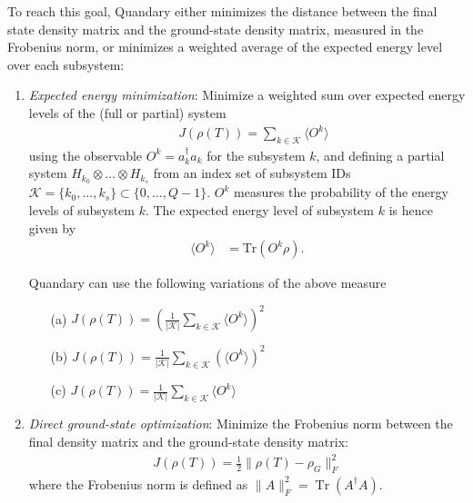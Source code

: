 \documentclass[11pt]{article}
\DeclareMathOperator{\Tr}{Tr}
\begin{document}
To reach this goal, Quandary either minimizes the distance between the final state
density matrix and the ground-state density matrix, measured in the Frobenius
norm, or minimizes a weighted average of the expected energy level over each subsystem:
\begin{enumerate}
  \item \textit{Expected energy minimization}: Minimize a weighted sum over
    expected energy levels of the (full or partial) system
    \begin{align}
       \quad J(\rho(T)) = \sum_{k\in \mathcal{K}} \langle O^k \rangle 
    \end{align}
    using the observable $O^k = a_k^\dag a_k$ for the subsystem $k$, and defining a partial system
    $H_{k_0}\otimes \dots \otimes H_{k_s}$ from an index set of
    subsystem IDs $\mathcal{K}=\{k_0,\dots,k_s\}\subset
    \{0,\dots,Q-1\}$. 
    $O^k$ measures the probability of the energy levels of subsystem $k$. The
   expected energy level of subsystem $k$ is hence given by 
  \begin{align}
    \langle O^k \rangle &= \mbox{Tr}(O^k\rho).
    \label{eq:expected_energy1}
  \end{align}
    
    Quandary can use the following variations of the
    above measure
    \begin{enumerate}
      \item[(a)] $J(\rho(T)) =
        \left(\frac{1}{|\mathcal{K}|}\sum_{k\in\mathcal{K}}\langle O^k \rangle
        \right)^2$
      \item[(b)] $J(\rho(T)) =
        \frac{1}{|\mathcal{K}|}\sum_{k\in\mathcal{K}}\left(\langle O^k \rangle
        \right)^2 $
      \item[(c)] $J(\rho(T)) =
        \frac{1}{|\mathcal{K}|}\sum_{k\in\mathcal{K}}\langle O^k \rangle$
    \end{enumerate}
  \item \textit{Direct ground-state optimization}: Minimize the Frobenius norm
    between the final density matrix and the ground-state density matrix:
    \begin{align}\label{eq:ground-state-obj}
      J(\rho(T)) = \frac 12 \| \rho(T) - \rho_G \|^2_F 
    \end{align}
    where the Frobenius norm is defined as $\|A\|^2_F = \Tr(A^{\dagger}A)$.
\end{enumerate}
\end{document}

